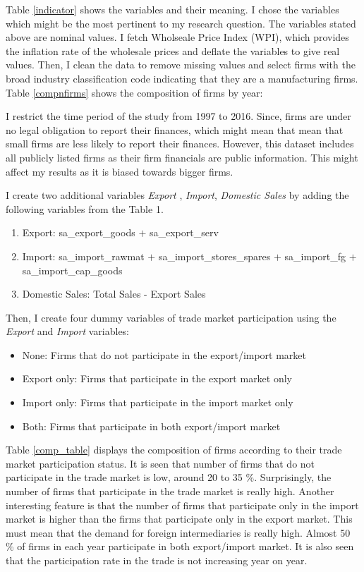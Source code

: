 \documentclass[11pt]{article}
\begin{document}
Table \ref{indicator} shows the variables and their meaning. I chose the variables
which might be the most pertinent to my research question. 
The variables stated above are nominal values. I fetch Wholseale Price
Index (WPI), which provides the inflation rate of the wholesale prices
and deflate the variables to give real values. Then, I clean the data
to remove missing values and select firms with the broad industry
classification code indicating that they are a manufacturing
firms. Table \ref{compnfirms} shows the composition of firms by year: 
\begin{center}

\end{center}
 I restrict the time period of the study from 1997 to 2016.  Since, firms
are under no legal obligation to report their finances, which might
mean that mean that small firms are less likely to report their
finances. However, this dataset includes all publicly listed firms as
their firm financials are public information. This might affect my
results as it is biased towards bigger firms. 

I create two additional variables \textit{Export} , \textit{Import},
\textit{Domestic Sales}
by adding the following variables from the Table 1.  
\begin{enumerate}
\item Export: sa\_export\_goods $+$ sa\_export\_serv
\item Import: sa\_import\_rawmat $+$        sa\_import\_stores\_spares
  $+$ sa\_import\_fg            $+$sa\_import\_cap\_goods
\item Domestic Sales: Total Sales - Export Sales
\end{enumerate}
Then, I create four dummy variables of trade market participation
using the \textit{Export} and \textit{Import} variables: 
\begin{itemize}
\item None: Firms that do not participate in the export/import market
\item Export only: Firms that participate in the export market only
\item Import only: Firms that participate in the import market only
\item Both: Firms that participate in both export/import market
\end{itemize}
Table \ref{comp_table} displays the composition of firms according to their trade market
participation status. It is seen that number of firms that do not
participate in the trade market is low,  around 20 to 35
\%. Surprisingly, the number of firms that participate in the trade
market is really high. Another interesting feature is that the number
of firms that participate only in the import market is higher than the
firms that participate only in the export market. This must mean that
the demand for foreign intermediaries is really high. Almost 50 \% of
firms in each year participate in both export/import market.  It is
also seen that the participation rate in the trade is not increasing
year on year.  
\begin{center}

\end{center}
\end{document}
